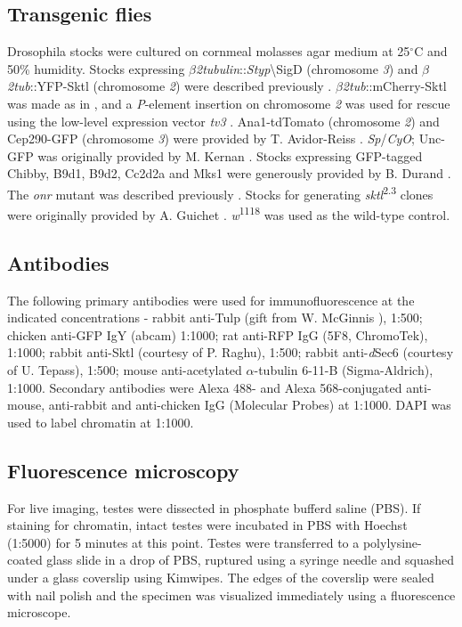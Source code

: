\documentclass[12pt, twoside, letterpaper]{article}
\begin{document}
\subsection{Transgenic flies}
Drosophila stocks were cultured on cornmeal molasses agar medium at 25$^{\circ}$C
and 50\% humidity.
Stocks expressing $\beta$\textit{2tubulin}::\textit{Styp}\textbackslash{SigD} (chromosome \textit{3})
and $\beta$\textit{2tub}::YFP-Sktl (chromosome \textit{2})
were described previously \citep{wei2008depletion, fabian2010phosphatidylinositol}.
$\beta$\textit{2tub}::mCherry-Sktl was made as in \citep{wei2008depletion},
and a \textit{P}-element insertion on chromosome \textit{2} was used for rescue using the low-level
expression vector \textit{tv3} \citep{wong2005pip2}.
Ana1-tdTomato (chromosome \textit{2}) and Cep290-GFP (chromosome \textit{3}) were provided
by T. Avidor-Reiss \citep{basiri2014migrating}.
\textit{Sp}/\textit{CyO}; Unc-GFP was originally provided by M. Kernan \citep{baker2004mechanosensory}.
Stocks expressing GFP-tagged Chibby, B9d1, B9d2, Cc2d2a and Mks1 were generously
provided by B. Durand \citep{enjolras2012drosophila, vieillard2016transition}.
The \textit{onr} mutant was described previously \citep{giansanti2015exocyst}.
Stocks for generating \textit{sktl}\textsuperscript{2.3} clones were originally provided by
A. Guichet \citep{gervais2008pip5k}.
\textit{w}\textsuperscript{1118} was used as the wild-type control.

\subsection{Antibodies}
The following primary antibodies were used for immunofluorescence
at the indicated concentrations -
rabbit anti-Tulp (gift from W. McGinnis \citep{ronshaugen2002structure}), 1:500;
chicken anti-GFP IgY (abcam) 1:1000;
rat anti-RFP IgG (5F8, ChromoTek), 1:1000;
rabbit anti-Sktl (courtesy of P. Raghu), 1:500;
rabbit anti-\textit{d}Sec6 (courtesy of U. Tepass), 1:500;
mouse anti-acetylated $\alpha$-tubulin 6-11-B (Sigma-Aldrich), 1:1000.
Secondary antibodies were Alexa 488- and Alexa 568-conjugated
anti-mouse, anti-rabbit and anti-chicken
IgG (Molecular Probes) at 1:1000.
DAPI was used to label chromatin at 1:1000.

\subsection{Fluorescence microscopy}
For live imaging, testes were dissected in phosphate bufferd saline (PBS).
If staining for chromatin, intact testes were incubated in PBS with
Hoechst (1:5000) for 5 minutes at this point.
Testes were transferred to a polylysine-coated glass slide in a drop of PBS,
ruptured using a syringe needle and
squashed under a glass coverslip using Kimwipes.
The edges of the coverslip were sealed with nail polish
and the specimen was visualized immediately using a fluorescence microscope.
\end{document}
